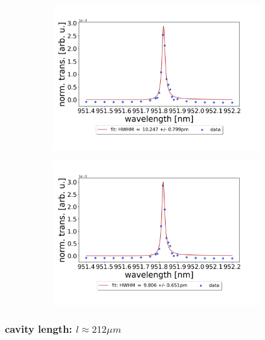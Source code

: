 \begin{figure}[h!]
\begin{subfigure}[b]{0.49\textwidth}
        \includegraphics[width=\textwidth]{figures/results/single fano fits/380um_M5_fit_3.png}
        \caption{}
        \label{fig:380um_M5_fit_3}
    \end{subfigure}
    \begin{subfigure}[b]{0.49\textwidth}
        \includegraphics[width=\textwidth]{figures/results/single fano fits/380um_M5_fit_4.png}
        \caption{}
        \label{fig:380um_M5_fit_4}
    \end{subfigure}
\end{figure}

\clearpage
\subsubsection*{cavity length: $l \approx 212 \mu m$}

